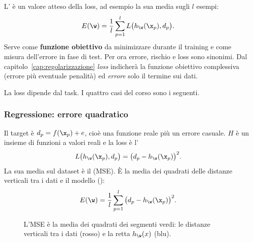 \begin{definizione}
L' è un valore atteso della loss, ad esempio la sua media sugli $l$ esempi:
\begin{equation}\label{eq:errore-medio}
E(\w) = \frac1l\sum_{p=1}^{l} L\big(h_\w(\x_p), d_p\big).
\end{equation}
Serve come \textbf{funzione obiettivo} da minimizzare durante il training e come misura dell'errore in fase di
test. Per ora errore, rischio e loss sono sinonimi. Dal capitolo~\ref{cap:regolarizzazione} \emph{loss}
indicherà la funzione obiettivo complessiva (errore più eventuale penalità) ed \emph{errore} solo il termine
sui dati.
\end{definizione}

La loss dipende dal task. I quattro casi del corso sono i seguenti.

\subsubsection{Regressione: errore quadratico}
Il target è $d_p = f(\x_p)+e$, cioè una funzione reale più un errore casuale. $H$ è un insieme di funzioni a
valori reali e la loss è l'
\[
L\big(h_\w(\x_p),d_p\big) = \big(d_p-h_\w(\x_p)\big)^2 .
\]
La sua media sul dataset è il  (MSE). È la media dei quadrati delle distanze
verticali tra i dati e il modello ():
\[
E(\w) = \frac1l\sum_{p=1}^{l}\big(d_p-h_\w(\x_p)\big)^2 .
\]

\begin{figure}[ht]
\centering
{}
\caption{L'MSE è la media dei quadrati dei segmenti verdi: le distanze verticali tra i dati (rosso) e la retta
$h_\w(x)$ (blu).}
\label{fig:mse}
\end{figure}

